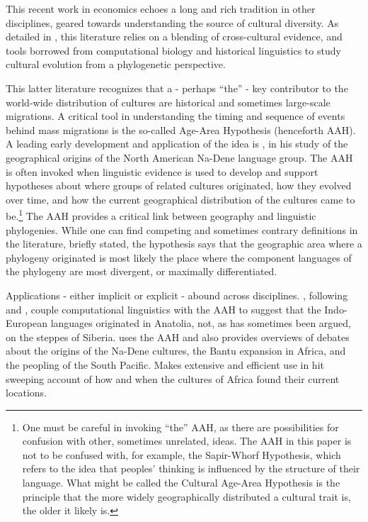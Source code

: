 \documentclass[11pt]{article}
\begin{document}
This recent work in economics echoes a long and rich tradition in other disciplines, geared towards understanding the source of cultural diversity. As detailed in \cite{mace05}, this literature relies on a blending of cross-cultural evidence, and tools borrowed from computational biology and historical linguistics to study cultural evolution from a phylogenetic perspective. 

This latter literature recognizes that a - perhaps ``the'' - key contributor to the world-wide distribution of cultures are historical and sometimes large-scale migrations. A critical tool in understanding the timing and sequence of events behind mass migrations is the so-called Age-Area Hypothesis (henceforth AAH). A leading early development and application of the idea is \cite{sapir16}, in his study of the geographical origins of the North American Na-Dene language group. The AAH is often invoked when linguistic evidence is used to develop and support hypotheses about where groups of related  cultures originated, how they evolved over time, and how the current geographical distribution of the cultures came to be.\footnote{One must be careful in invoking ``the'' AAH, as there are possibilities for confusion with other, sometimes unrelated, ideas. The AAH in this paper is not to be confused with, for example, the Sapir-Whorf Hypothesis, which refers to the idea that peoples' thinking is influenced by the structure of their language. What might be called the Cultural Age-Area Hypothesis is the principle that the more widely geographically distributed a cultural trait is, the older it likely is. } The AAH provides a critical link between geography and linguistic phylogenies. While one can find competing and sometimes contrary definitions in the literature, briefly stated, the hypothesis says that the geographic area where a phylogeny originated is most likely the place where the component languages of the phylogeny are most divergent, or maximally differentiated.

Applications - either implicit or explicit  - abound across disciplines. \cite{atkinson03}, following \cite{renfrew87} and \cite{dogolpolsky88}, couple computational linguistics with the AAH to suggest that the Indo-European languages originated in Anatolia, not, as has sometimes been argued, on the steppes of Siberia. \cite{ruhlen94} uses the AAH and also provides overviews of debates about the origins of the Na-Dene cultures, the Bantu expansion in Africa, and the peopling of the South Pacific. \cite{ehret01} Makes extensive and efficient use in hit sweeping account of how and when the cultures of Africa found their current locations.
\end{document}
